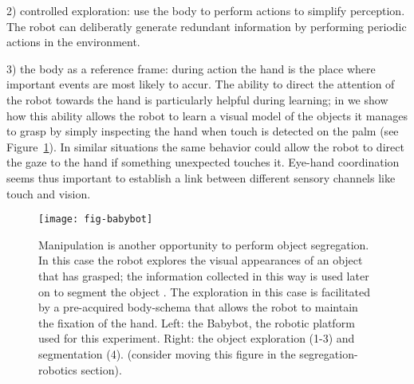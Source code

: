 2) controlled exploration: use the body to perform actions to simplify perception. The robot can deliberatly generate redundant information by performing periodic actions in the environment.

3) the body as a reference frame: during action the hand is the place where important events are most likely to accur. The ability to direct the attention of the robot towards the hand is particularly helpful during learning; in \cite{natale05exploring} we show how this ability allows the robot to learn a visual model of the objects it manages to grasp by simply inspecting the hand when touch is detected on the palm (see Figure~\ref{fig:babybot}). In similar situations the same behavior could allow the robot to direct the gaze to the hand if something unexpected touches it. Eye-hand coordination seems thus important to establish a link between different sensory channels like touch and vision.


\begin{figure}[t]

\centerline{
\texttt{[image: fig-babybot]}
}

\caption{
%
Manipulation is another opportunity to perform object segregation. In this case the robot explores the visual appearances of an object that has grasped; the information collected in this way is used later on to segment the object \cite{natale05exploring}. The exploration in this case is facilitated by a pre-acquired body-schema that allows the robot to maintain the fixation of the hand. Left: the Babybot, the robotic platform used for this experiment. Right: the object exploration (1-3) and segmentation (4). (consider moving this figure in the segregation-robotics section). 
%
}

\label{fig:babybot}

\end{figure}


